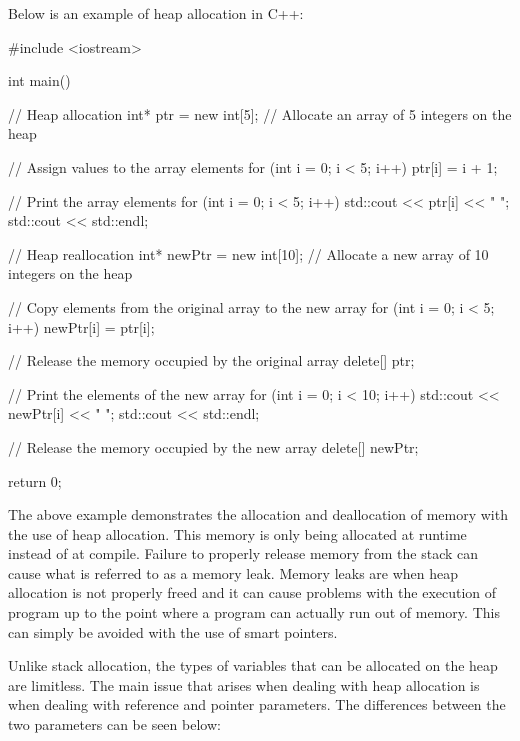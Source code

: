 \begin{highlight}

Below is an example of heap allocation in C++:

\begin{code}
#include <iostream>

int main() {
    // Heap allocation
    int* ptr = new int[5];  // Allocate an array of 5 integers on the heap

    // Assign values to the array elements
    for (int i = 0; i < 5; i++) {
        ptr[i] = i + 1;
    }

    // Print the array elements
    for (int i = 0; i < 5; i++) {
        std::cout << ptr[i] << " ";
    }
    std::cout << std::endl;

    // Heap reallocation
    int* newPtr = new int[10];  // Allocate a new array of 10 integers on the heap

    // Copy elements from the original array to the new array
    for (int i = 0; i < 5; i++) {
        newPtr[i] = ptr[i];
    }

    // Release the memory occupied by the original array
    delete[] ptr;

    // Print the elements of the new array
    for (int i = 0; i < 10; i++) {
        std::cout << newPtr[i] << " ";
    }
    std::cout << std::endl;

    // Release the memory occupied by the new array
    delete[] newPtr;

    return 0;
}    
\end{code}

The above example demonstrates the allocation and deallocation of memory with the use of heap allocation. This memory is only being allocated at runtime instead of at compile. Failure to properly 
release memory from the stack can cause what is referred to as a memory leak. Memory leaks are when heap allocation is not properly freed and it can cause problems with the execution of program up
to the point where a program can actually run out of memory. This can simply be avoided with the use of smart pointers.

\end{highlight}

Unlike stack allocation, the types of variables that can be allocated on the heap are limitless. The main issue that arises when dealing with heap allocation is when dealing with reference and pointer
parameters. The differences between the two parameters can be seen below:

